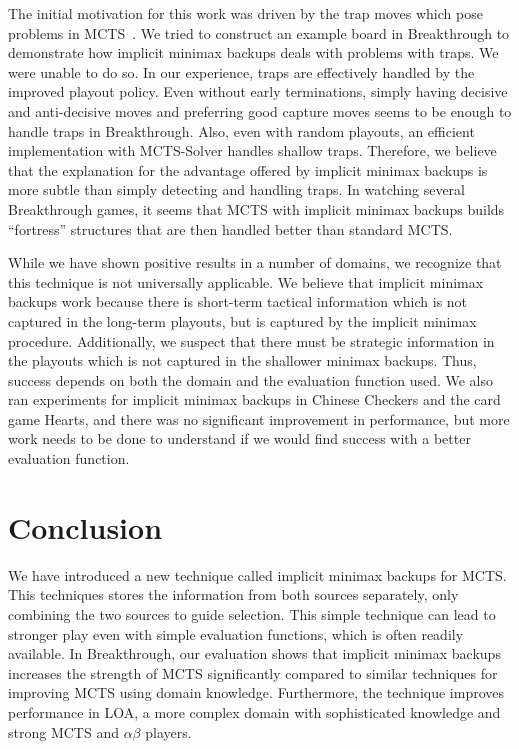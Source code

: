 \documentclass[conference]{IEEEtran}
\begin{document}
The initial motivation for this work was driven by the trap moves which pose problems in 
MCTS~\cite{Ramanujan11Tradeoffs,Baier13MinimaxHybrids,Gudmundsson13Sufficiency}. We tried to construct an example board in Breakthrough 
to demonstrate how implicit minimax backups deals with problems with traps. We were unable to do so. In our experience, 
traps are effectively handled by the improved playout policy. Even without early terminations, 
simply having decisive and anti-decisive moves and preferring good capture moves seems to be enough to handle traps in Breakthrough.
Also, even with random playouts, an efficient implementation with MCTS-Solver handles shallow traps.
Therefore, we believe that the explanation for the advantage offered by implicit minimax backups is more subtle
than simply detecting and handling traps. In watching several Breakthrough games, it seems that MCTS with implicit minimax backups 
builds ``fortress'' structures \cite{Guid12Fortress} that are then handled better than standard MCTS.  

While we have shown positive results in a number of domains, we recognize that this 
technique is not universally applicable. We believe that implicit minimax backups work because there is short-term tactical 
information which 
is not captured in the long-term playouts, but is captured by the implicit minimax procedure. Additionally, we suspect that 
there must be strategic 
information in the playouts which is not captured in the shallower minimax backups. Thus, success depends on both the domain and 
the evaluation function used. 
We also ran experiments for implicit minimax backups in Chinese Checkers and the card game Hearts, 
and there was no significant improvement in performance,  
but more work needs to be done to understand if we would find success with a better evaluation function.

\section{Conclusion}

We have introduced a new technique called implicit minimax backups for MCTS. 
This techniques stores the information from both sources separately, only combining the
two sources to guide selection. This simple technique can lead to stronger play even with
simple evaluation functions, which is often readily available. 
In Breakthrough, our evaluation shows that implicit minimax backups increases 
the strength of MCTS significantly compared to similar techniques for improving MCTS
using domain knowledge. Furthermore, the technique improves 
performance in LOA, a more complex domain with sophisticated knowledge and 
strong MCTS and $\alpha \beta$ players. 
\end{document}

